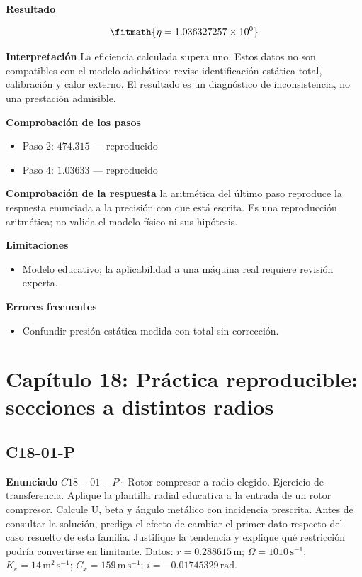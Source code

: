\documentclass[10pt,openany]{book}
\begin{document}
\noindent\textbf{Resultado}

\[
\fitmath{\eta=1.036327257\times10^{0}}
\]

\noindent\textbf{Interpretación}
La eficiencia calculada supera uno. Estos datos no son compatibles con el modelo adiabático: revise identificación estática-total, calibración y calor externo. El resultado es un diagnóstico de inconsistencia, no una prestación admisible.

\noindent\textbf{Comprobación de los pasos}
\begin{itemize}
\item Paso 2: $474.315$ — reproducido
\item Paso 4: $1.03633$ — reproducido
\end{itemize}

\noindent\textbf{Comprobación de la respuesta} la aritmética del último paso reproduce la respuesta enunciada a la precisión con que está escrita. Es una reproducción aritmética; no valida el modelo físico ni sus hipótesis.

\noindent\textbf{Limitaciones}
\begin{itemize}
\item Modelo educativo; la aplicabilidad a una máquina real requiere revisión experta.
\end{itemize}

\noindent\textbf{Errores frecuentes}
\begin{itemize}
\item Confundir presión estática medida con total sin corrección.
\end{itemize}
\section{Capítulo 18: Práctica reproducible: secciones a distintos radios}
\subsection*{C18-01-P}

\noindent\textbf{Enunciado}
\(C18-01-P \cdot\) Rotor compresor a radio elegido. Ejercicio de transferencia. Aplique la plantilla radial educativa a la entrada de un rotor compresor. Calcule U, beta y ángulo metálico con incidencia prescrita. Antes de consultar la solución, prediga el efecto de cambiar el primer dato respecto del caso resuelto de esta familia. Justifique la tendencia y explique qué restricción podría convertirse en limitante. Datos: \(r=0.288615\, \mathrm{m}\); \(\Omega=1010\, \mathrm{s}^{-1}\); \(K_e=14\, \mathrm{m}^{2}\,\mathrm{s}^{-1}\); \(C_x=159\, \mathrm{m}\,\mathrm{s}^{-1}\); \(i=-0.01745329\, \mathrm{rad}\).
\end{document}
